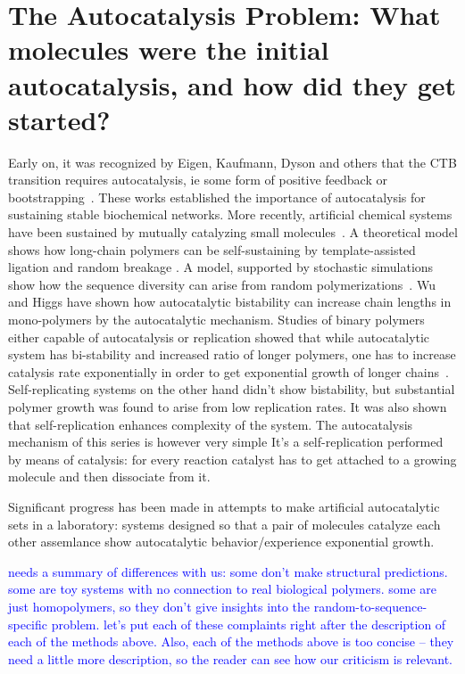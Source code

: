 \documentclass[journal=jacsat,manuscript=article,layout=twocolumn]{achemso}
\newcommand*{\blue}[1]{\textcolor{blue}{#1}}
\begin{document}
 \section{The Autocatalysis Problem:  What molecules were the initial autocatalysis, and how did 
they get started?}
 
 Early on, it was recognized by Eigen, Kaufmann, Dyson and others that the CTB transition requires 
 autocatalysis, ie some form of positive feedback or 
bootstrapping~\cite{Eigen1978,Dyson1985,Prigogine1989,Kauffman1986}.  These works established the 
importance of 
autocatalysis for sustaining stable biochemical networks. More recently, artificial chemical systems 
have been sustained by mutually catalyzing 
small molecules~\cite{segre1998graded,Segre2000,Markovitch2012}.  A theoretical model shows how 
long-chain polymers can be self-sustaining by template-assisted ligation and random breakage 
\cite{Tkachenko2014}.  A model, supported by stochastic simulations show how the sequence diversity 
can arise from random 
polymerizations~\cite{Derr2012}.  Wu and Higgs\cite{Wu2009} have shown how autocatalytic 
bistability can increase chain lengths in mono-polymers by the autocatalytic mechanism.  Studies of 
binary polymers either 
capable of autocatalysis or replication showed that while autocatalytic system has bi-stability and 
increased ratio of longer polymers, one has to increase catalysis rate exponentially in order to 
get 
exponential growth of longer chains~\cite{nowak2008prevolutionary,Ohtsuki2009,Chen2012}. 
Self-replicating systems on the other hand didn't show bistability, but substantial polymer growth 
was found to arise from low replication rates. It was also shown that self-replication enhances 
complexity of the system. The autocatalysis mechanism of this series is however very simple It's a 
self-replication performed by means of catalysis: for every reaction catalyst has to get attached 
to 
a growing molecule and then dissociate from it.

 Significant progress has been made in attempts to make artificial autocatalytic sets in a 
 laboratory\cite{VonKiedrowski1986,Lincoln2009,Vaidya2012}: systems designed so that a pair of 
molecules catalyze each other assemlance show autocatalytic behavior/experience exponential growth.
 
 \blue{needs a summary of differences with us:  some don't make structural predictions.  
 some are toy systems with no connection to real biological polymers.  some are just homopolymers, 
so they don't give insights into the random-to-sequence-specific problem.  let's put each of these 
complaints right after the description of each of the methods above.  Also, each of the methods 
above is too concise -- they need a little more description, so the reader can see how our 
criticism 
is relevant.}
 
\end{document}
